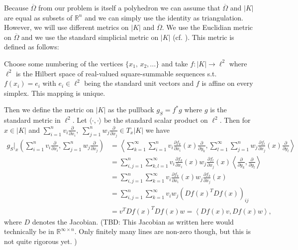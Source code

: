 \documentclass[12pt,a4paper]{article}
\numberwithin{equation}{subsection}
\numberwithin{lemma}{subsection}
\theoremstyle{definition}
\newcommand{\omegabar}{\overline{\Omega}}
\newcommand{\real}{\mathbb{R}}
\begin{document}
Because $\omegabar$ from our problem is itself a polyhedron we can
assume that $\omegabar$ and $|K|$ are equal as subsets of $\real^n$ and we can
simply use the identity as triangulation.
However, we will use different metrics on $|K|$ and $\omegabar$. 
We use the Euclidian metric on 
$\omegabar$ and we use the standard simplicial metric on $|K|$ (cf. 
\cite[p.191]{goldshtein}). This metric is defined as follows:

Choose some numbering of the vertices $\{ x_1,\, x_2, ... \}$ and
take $f: |K| \rightarrow \ell^2$ where $\ell^2$ is the 
Hilbert space of real-valued square-summable sequences s.t. $f(x_i) = e_i$ 
with $e_i \in \ell^2$ being the standard unit vectors and $f$ is affine on 
every simplex. This mapping is unique.%

Then we define the metric on $|K|$ as the pullback $g_S = f^*g$ 
where $g$ is the standard metric in $\ell^2$. Let $\langle \cdot , 
\cdot \rangle$ be the standard scalar product on $\ell^2$. Then for $x \in |K|$ 
and $\sum_{i=1}^n v_i \frac{\partial}{\partial x_i}, \; 
\sum_{j=1}^n w_j \frac{\partial}{\partial x_j} \in T_x |K|$ we have 
\begin{align*}
g_S|_x\left(\sum_{i=1}^n v_i \frac{\partial}{\partial x_i}, 
\sum_{j=1}^n w_j \frac{\partial}{\partial x_j}\right) &= 
\left\langle \sum_{k=1}^\infty \sum_{i=1}^n v_i 
\frac{\partial f_k}{\partial x_i} (x)
\frac{\partial }{\partial y_k}, 
\sum_{l=1}^\infty \sum_{j=1}^n w_j \frac{\partial f_l}{\partial x_j} (x)
\frac{\partial }{\partial y_l} \right\rangle \\   
&= \sum_{i,j=1}^n \sum_{k,l=1}^\infty v_i \frac{\partial f_k}{\partial x_i} (x)
w_j \frac{\partial f_l}{\partial x_j} (x) 
\left\langle \frac{\partial }{\partial y_k}, \frac{\partial }{\partial y_l} 
\right\rangle\\
&= \sum_{i,j=1}^n \sum_{k=1}^\infty v_i \frac{\partial f_k}{\partial x_i} (x)
w_j \frac{\partial f_k}{\partial x_j} (x)\\
&= \sum_{i,j=1}^n \sum_{k=1}^\infty v_i w_j \left( Df(x)^T Df(x) \right)_{ij} \\
&= v^T Df(x)^T Df(x) w = \left\langle Df(x) v, Df(x) w \right\rangle,
\end{align*}
where $D$ denotes the Jacobian. 
{\color{red} (TBD: This Jacobian as written here would technically be in 
$\real^{\infty \times n}$. Only finitely many lines are non-zero though, 
but this is not quite rigorous yet. )}
\end{document}
